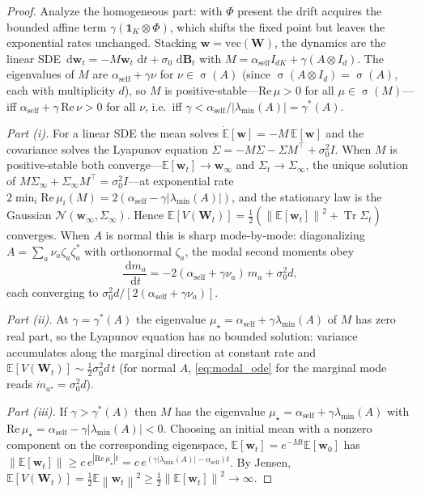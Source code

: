 \documentclass[12pt]{article}
\theoremstyle{plain}
\theoremstyle{definition}
\DeclareMathOperator{\Tr}{Tr}
\DeclareMathOperator{\spec}{\sigma}
\newcommand{\E}{\mathbb{E}}
\newcommand{\W}{\mathbf{W}}
\newcommand{\norm}[1]{\left\lVert #1 \right\rVert}
\newcommand{\abs}[1]{\left| #1 \right|}
\newcommand{\dif}{\,\mathrm{d}}
\begin{document}
\begin{proof}
  Analyze the homogeneous part: with $\Phi$ present the drift acquires the
  bounded affine term $\gamma(\mathbf 1_K\otimes\Phi)$, which shifts the
  fixed point but leaves the exponential rates unchanged.  Stacking
  $\mathbf w=\mathrm{vec}(\W)$, the dynamics are the linear SDE
  $\dif\mathbf w_t=-M\mathbf w_t\,\dif t+\sigma_0\,\dif\mathbf B_t$ with
  $M=\alpha_{\mathrm{self}} I_{dK}+\gamma(A\otimes I_d)$.  The eigenvalues of
  $M$ are $\alpha_{\mathrm{self}}+\gamma\nu$ for $\nu\in\spec(A)$ (since
  $\spec(A\otimes I_d)=\spec(A)$, each with multiplicity $d$), so $M$ is
  positive-stable---$\mathrm{Re}\,\mu>0$ for all $\mu\in\spec(M)$---iff
  $\alpha_{\mathrm{self}}+\gamma\,\mathrm{Re}\,\nu>0$ for all $\nu$, i.e.\ iff
  $\gamma<\alpha_{\mathrm{self}}/\abs{\lambda_{\min}(A)}=\gamma^*(A)$.

  \emph{Part (i).}  For a linear SDE the mean solves
  $\dot{\E}[\mathbf w]=-M\,\E[\mathbf w]$ and the covariance solves the
  Lyapunov equation $\dot\Sigma=-M\Sigma-\Sigma M^\top+\sigma_0^2 I$.  When
  $M$ is positive-stable both converge---$\E[\mathbf w_t]\to\mathbf
  w_\infty$ and $\Sigma_t\to\Sigma_\infty$, the unique solution of
  $M\Sigma_\infty+\Sigma_\infty M^\top=\sigma_0^2 I$---at exponential rate
  $2\min_i\mathrm{Re}\,\mu_i(M)=2(\alpha_{\mathrm{self}}-\gamma\abs{\lambda_{\min}(A)})$,
  and the stationary law is the Gaussian $\mathcal N(\mathbf w_\infty,\Sigma_\infty)$.
  Hence $\E[V(\W_t)]=\tfrac12(\norm{\E[\mathbf w_t]}^2+\Tr\Sigma_t)$ converges.
  When $A$ is normal this is sharp mode-by-mode: diagonalizing
  $A=\sum_a\nu_a\zeta_a\zeta_a^*$ with orthonormal $\zeta_a$, the modal
  second moments obey
  \begin{equation}
    \frac{\dif m_a}{\dif t}=-2(\alpha_{\mathrm{self}}+\gamma\nu_a)\,m_a+\sigma_0^2 d,
    \label{eq:modal_ode}
  \end{equation}
  each converging to $\sigma_0^2 d/[2(\alpha_{\mathrm{self}}+\gamma\nu_a)]$.

  \emph{Part (ii).}  At $\gamma=\gamma^*(A)$ the eigenvalue
  $\mu_\star=\alpha_{\mathrm{self}}+\gamma\lambda_{\min}(A)$ of $M$ has zero
  real part, so the Lyapunov equation has no bounded solution: variance
  accumulates along the marginal direction at constant rate and
  $\E[V(\W_t)]\sim\tfrac12\sigma_0^2 d\,t$ (for normal $A$,
  \eqref{eq:modal_ode} for the marginal mode reads $\dot m_{a^\star}=\sigma_0^2 d$).

  \emph{Part (iii).}  If $\gamma>\gamma^*(A)$ then $M$ has the eigenvalue
  $\mu_\star=\alpha_{\mathrm{self}}+\gamma\lambda_{\min}(A)$ with
  $\mathrm{Re}\,\mu_\star=\alpha_{\mathrm{self}}-\gamma\abs{\lambda_{\min}(A)}<0$.
  Choosing an initial mean with a nonzero component on the corresponding
  eigenspace, $\E[\mathbf w_t]=e^{-Mt}\E[\mathbf w_0]$ has
  $\norm{\E[\mathbf w_t]}\ge c\,e^{\abs{\mathrm{Re}\,\mu_\star}t}
  =c\,e^{(\gamma\abs{\lambda_{\min}(A)}-\alpha_{\mathrm{self}})t}$.  By
  Jensen, $\E[V(\W_t)]=\tfrac12\E\norm{\mathbf w_t}^2\ge\tfrac12\norm{\E[\mathbf w_t]}^2\to\infty$.
\end{proof}
\end{document}
